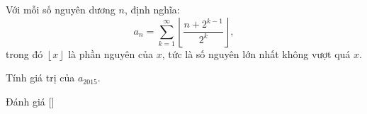 \ifshowproblem
\begin{problem}\label{problem:TWN-2015-TST3-Q3-P1}
    Với mỗi số nguyên dương \( n \), định nghĩa:
    \[
        a_n = \sum_{k=1}^{\infty} \left\lfloor \frac{n + 2^{k-1}}{2^k} \right\rfloor,
    \]
    trong đó \( \left\lfloor x \right\rfloor \) là phần nguyên của \( x \), tức là số nguyên lớn nhất không vượt quá \( x \).
    
    Tính giá trị của \( a_{2015} \).
\end{problem}
\fi

\ifshowinfo
Đánh giá [\textbf{}]\footnotemark
{}
\fi